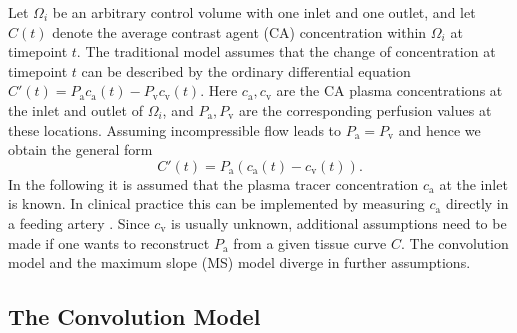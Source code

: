 \documentclass[journal,twocolumn]{IEEEtran}
\newcommand{\ca}{c_\mathrm{a}}
\newcommand{\cout}{c_{\mathrm{v}}}
\newcommand{\Pa}{P_{\mathrm{a}}}
\newcommand{\Pout}{P_{\mathrm{v}}}
\begin{document}
	Let $\Omega_i$ be an arbitrary control volume with one inlet and one outlet, and let $C(t)$ denote the average contrast agent (CA) concentration within $\Omega_i$ at timepoint $t$.
	The traditional model assumes that the change of concentration at timepoint $t$ can be described by the ordinary differential equation $C'(t) = \Pa\ca(t) - \Pout\cout(t)$. 
	Here $\ca,\cout$ are the CA plasma concentrations at the inlet and outlet of $\Omega_i$, and $\Pa,\Pout$ are the corresponding perfusion values at these locations.
	Assuming incompressible flow leads to $\Pa = \Pout$ and hence we obtain the general form
	\begin{equation}
		C'(t) = \Pa\left(\ca(t) - \cout(t)\right).
		\label{eq:classicgeneral}
	\end{equation}	
	In the following it is assumed that the plasma tracer concentration $\ca$ at the inlet is known.
	In clinical practice this can be implemented by measuring $\ca$ directly in a feeding artery \cite{ostergaard96}.
	Since $\cout$ is usually unknown, additional assumptions need to be made if one wants to reconstruct $\Pa$ from a given tissue curve $C$. The convolution model and the maximum slope (MS) model diverge in further assumptions.
	
	

	\subsection{The Convolution Model}\label{sec:conv}
	
\end{document}
